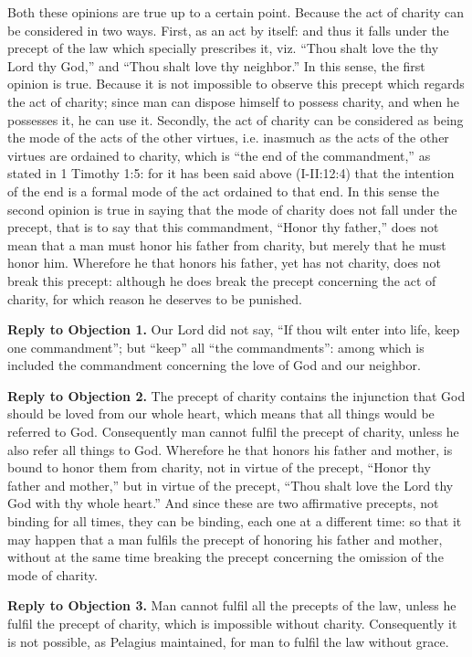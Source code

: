 Both these opinions are true up to a certain point. Because the act of charity can be considered in two ways. First, as an act by itself: and thus it falls under the precept of the law which specially prescribes it, viz. ``Thou shalt love the thy Lord thy God,'' and ``Thou shalt love thy neighbor.'' In this sense, the first opinion is true. Because it is not impossible to observe this precept which regards the act of charity; since man can dispose himself to possess charity, and when he possesses it, he can use it. Secondly, the act of charity can be considered as being the mode of the acts of the other virtues, i.e. inasmuch as the acts of the other virtues are ordained to charity, which is ``the end of the commandment,'' as stated in 1 Timothy 1:5: for it has been said above (I-II:12:4) that the intention of the end is a formal mode of the act ordained to that end. In this sense the second opinion is true in saying that the mode of charity does not fall under the precept, that is to say that this commandment, ``Honor thy father,'' does not mean that a man must honor his father from charity, but merely that he must honor him. Wherefore he that honors his father, yet has not charity, does not break this precept: although he does break the precept concerning the act of charity, for which reason he deserves to be punished.

\textbf{Reply to Objection 1.} Our Lord did not say, ``If thou wilt enter into life, keep one commandment''; but ``keep'' all ``the commandments'': among which is included the commandment concerning the love of God and our neighbor.

\textbf{Reply to Objection 2.} The precept of charity contains the injunction that God should be loved from our whole heart, which means that all things would be referred to God. Consequently man cannot fulfil the precept of charity, unless he also refer all things to God. Wherefore he that honors his father and mother, is bound to honor them from charity, not in virtue of the precept, ``Honor thy father and mother,'' but in virtue of the precept, ``Thou shalt love the Lord thy God with thy whole heart.'' And since these are two affirmative precepts, not binding for all times, they can be binding, each one at a different time: so that it may happen that a man fulfils the precept of honoring his father and mother, without at the same time breaking the precept concerning the omission of the mode of charity.

\textbf{Reply to Objection 3.} Man cannot fulfil all the precepts of the law, unless he fulfil the precept of charity, which is impossible without charity. Consequently it is not possible, as Pelagius maintained, for man to fulfil the law without grace.

